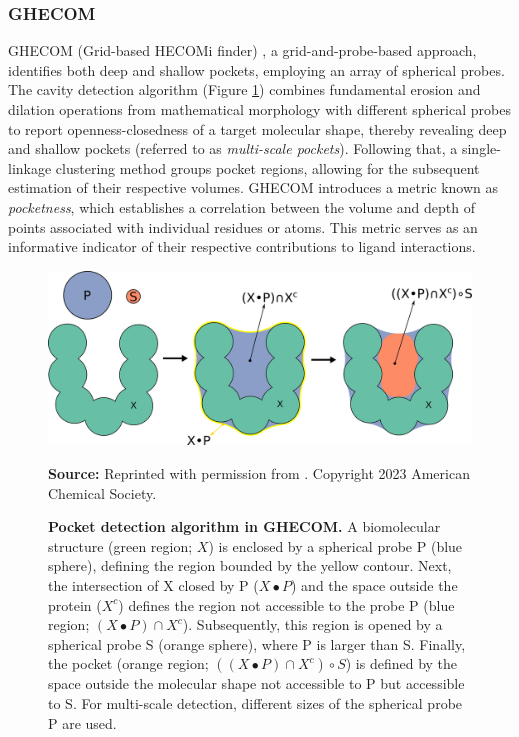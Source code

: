 \documentclass[Ingles]{phdthesis}
\begin{document}
\subsubsection{GHECOM}

GHECOM (Grid-based HECOMi finder) \cite{ghecom}, a grid-and-probe-based approach, identifies both deep and shallow pockets, employing an array of spherical probes. The cavity detection algorithm (Figure \ref{fig:ghecom-schema}) combines fundamental erosion and dilation operations from mathematical morphology \cite{matheron1974,serra1982} with different spherical probes to report openness-closedness of a target molecular shape, thereby revealing deep and shallow pockets (referred to as \textit{multi-scale pockets}). Following that, a single-linkage clustering method groups pocket regions, allowing for the subsequent estimation of their respective volumes. GHECOM introduces a metric known as \textit{pocketness}, which establishes a correlation between the volume and depth of points associated with individual residues or atoms. This metric serves as an informative indicator of their respective contributions to ligand interactions.

\begin{figure}[H]
  \centerline{\includegraphics[scale=0.9]{images/ghecom-schema.png}}
  \centerline{\tiny{\textbf{Source:} Reprinted with permission from \cite{guerra2023B}. Copyright 2023 American Chemical Society.}}
  \caption[Pocket detection algorithm in GHECOM]{\textbf{Pocket detection algorithm in GHECOM.} A biomolecular structure (green region; $X$) is enclosed by a spherical probe P (blue sphere), defining the region bounded by the yellow contour. Next, the intersection of X closed by P ($X \bullet P$) and the space outside the protein ($X^c$) defines the region not accessible to the probe P (blue region; $(X \bullet P) \cap X^c$). Subsequently, this region is opened by a spherical probe S (orange sphere), where P is larger than S. Finally, the pocket (orange region; $((X \bullet P) \cap X^c) \circ S$) is defined by the space outside the molecular shape not accessible to P but accessible to S. For multi-scale detection, different sizes of the spherical probe P are used.}
  \label{fig:ghecom-schema}
\end{figure}
\end{document}
